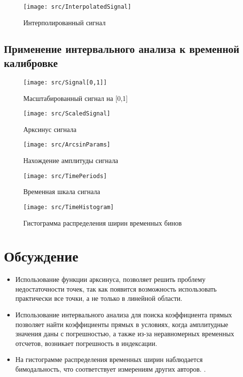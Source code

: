 \documentclass[a4paper]{article}
\begin{document}
    \begin{figure}[H]
        \centering
        \texttt{[image: src/InterpolatedSignal]}
        \caption{Интерполированный сигнал}
    \end{figure}
    \subsection{Применение интервального анализа к временной калибровке}
        \begin{figure}[H]
            \centering
            \texttt{[image: src/Signal[0,1]]}
            \caption{Масштабированный сигнал на [0,1]}
        \end{figure}
        \begin{figure}[H]
                \centering
                \texttt{[image: src/ScaledSignal]}
            \caption{Арксинус сигнала}
        \end{figure}

        \begin{figure}[H]
            \centering
            \texttt{[image: src/ArcsinParams]}
            \caption{Нахождение амплитуды сигнала}
        \end{figure}

        \begin{figure}[H]
            \centering
            \texttt{[image: src/TimePeriods]}
            \caption{Временная шкала сигнала}
        \end{figure}

        \begin{figure}[H]
            \centering
            \texttt{[image: src/TimeHistogram]}
            \caption{Гистограмма распределения ширин временных бинов}
        \end{figure}

\section{Обсуждение}
    \begin{itemize}
        \item Использование функции арксинуса, позволяет решить проблему недостаточности точек, так как появится возможность использовать
              практически все точки, а не только в линейной области.
        \item Использование интервального анализа для поиска коэффициента прямых позволяет найти коэффициенты прямых в
              условиях, когда амплитудные значения даны с погрешностью, а также из-за неравномерных временных отсчетов,
              возникает погрешность в индексации.
        \item На гистограмме распределения временных ширин наблюдается бимодальность, что соответствует
              измерениям других авторов. \cite{VKR}.
    \end{itemize}
\end{document}
